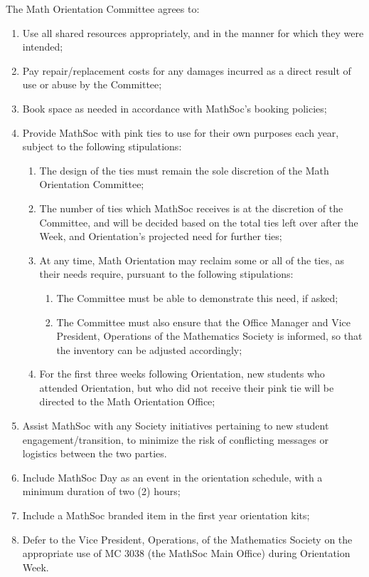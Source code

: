 \documentclass[12pt, letterpaper]{mathsoc}
\begin{document}
The Math Orientation Committee agrees to:
\begin{enumerate}
    \item Use all shared resources appropriately, and in the manner for which they were intended;
    \item Pay repair/replacement costs for any damages incurred as a direct result of use or abuse by the Committee;
    \item Book space as needed in accordance with MathSoc’s booking policies;
    \item Provide MathSoc with pink ties to use for their own purposes each year, subject to the following stipulations:
\begin{enumerate}
    \item The design of the ties must remain the sole discretion of the Math Orientation Committee;
    \item The number of ties which MathSoc receives is at the discretion of the Committee, and will be decided based on the total ties left over after the Week, and Orientation’s projected need for further ties;
    \item At any time, Math Orientation may reclaim some or all of the ties, as their needs require, pursuant to the following stipulations: 
\begin{enumerate}
    \item The Committee must be able to demonstrate this need, if asked;
    \item The Committee must also ensure that the Office Manager and Vice President, Operations of the Mathematics Society is informed, so that the inventory can be adjusted accordingly;
\end{enumerate}
    \item For the first three weeks following Orientation, new students who attended Orientation, but who did not receive their pink tie will be directed to the Math Orientation Office;
\end{enumerate}
    \item Assist MathSoc with any Society initiatives pertaining to new student 
    engagement/transition, to minimize the risk of conflicting messages or 
    logistics between the two parties.
    \item Include MathSoc Day as an event in the orientation schedule, with a minimum duration of two (2) hours;
    \item Include a MathSoc branded item in the first year orientation kits;
    \item Defer to the Vice President, Operations, of the Mathematics Society on the appropriate use of MC 3038 (the MathSoc Main Office) during Orientation Week.
\end{enumerate}
\end{document}
